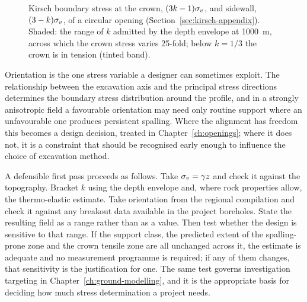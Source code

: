 \begin{figure}[htbp]
\centering
{}
\caption{Kirsch boundary stress at the crown, $(3k-1)\sigma_v$, and sidewall, $(3-k)\sigma_v$, of a circular opening (Section~\ref{sec:kirsch-appendix}). Shaded: the range of $k$ admitted by the depth envelope at 1000~m, across which the crown stress varies 25-fold; below $k = 1/3$ the crown is in tension (tinted band).}
\label{fig:stress-bracket-kirsch}
\end{figure}

Orientation is the one stress variable a designer
can sometimes exploit. The relationship between the excavation axis and the
principal stress directions determines the boundary stress distribution around
the profile, and in a strongly anisotropic field a
favourable orientation may need only routine support where an unfavourable
one produces persistent spalling. Where the alignment has
freedom this becomes a design decision, treated in
Chapter~\ref{ch:openings}; where it does not, it is a constraint that should be
recognised early enough to influence the choice of excavation method.

A defensible first pass proceeds as follows. Take $\sigma_v = \gamma z$ and check it
against the topography. Bracket $k$ using the depth envelope and, where rock
properties allow, the thermo-elastic estimate. Take orientation from the
regional compilation and check it against any breakout data available in the
project boreholes. State the resulting field as a range rather than as a
value. Then test whether the design is sensitive to that range. If the support
class, the predicted extent of the spalling-prone zone and the crown tensile
zone are all unchanged across it, the estimate is adequate and no measurement
programme is required; if any of them changes, that sensitivity is the
justification for one. The same test governs investigation targeting in
Chapter~\ref{ch:ground-modelling}, and it is the appropriate basis for
deciding how much stress determination a project needs.

\chapterreferences

